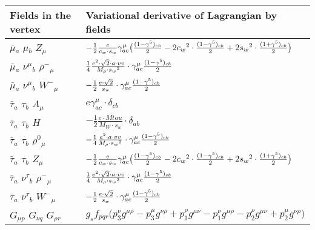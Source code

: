 \begin{center}
\begin{tabular}{|l|l|} \hline
Fields in the vertex & Variational derivative of Lagrangian by fields \\ \hline
$\bar{\mu}{}_{a }$ \phantom{-} $\mu{}_{b }$ \phantom{-} ${Z}_{\mu }$ \phantom{-}  &
	$-\frac{1}{2}\frac{ e}{ c_w \cdot s_w}\gamma_{a c}^\mu \big({(1-\gamma^5)_{c b}\over 2} -2 c_w{}^2 \cdot {(1-\gamma^5)_{c b}\over 2} +2 s_w{}^2 \cdot {(1+\gamma^5)_{c b}\over 2} \big)$\\[2mm]
$\bar{\mu}{}_{a }$ \phantom{-} $\nu^\mu{}_{b }$ \phantom{-} $\rho^-{}_{\mu }$ \phantom{-}  &
	$\frac{1}{4}\frac{ e{}^2  \cdot\sqrt{2} \cdot a \cdot vv}{ M_{\rho} \cdot s_w{}^2 }\cdot \gamma_{a c}^\mu {(1-\gamma^5)_{c b}\over 2} $\\[2mm]
$\bar{\mu}{}_{a }$ \phantom{-} $\nu^\mu{}_{b }$ \phantom{-} $W^-{}_{\mu }$ \phantom{-}  &
	$-\frac{1}{2}\frac{ e \cdot\sqrt{2}}{ s_w}\cdot \gamma_{a c}^\mu {(1-\gamma^5)_{c b}\over 2} $\\[2mm]
$\bar{\tau}{}_{a }$ \phantom{-} $\tau{}_{b }$ \phantom{-} ${A}_{\mu }$ \phantom{-}  &
	$ e\gamma_{a c}^\mu \cdot \delta_{c b} $\\[2mm]
$\bar{\tau}{}_{a }$ \phantom{-} $\tau{}_{b }$ \phantom{-} ${H}_{}$ \phantom{-}  &
	$-\frac{1}{2}\frac{ e \cdot Mtau}{ M_W \cdot s_w}\cdot \delta_{a b} $\\[2mm]
$\bar{\tau}{}_{a }$ \phantom{-} $\tau{}_{b }$ \phantom{-} $\rho^0{}_{\mu }$ \phantom{-}  &
	$-\frac{1}{4}\frac{ e{}^2  \cdot a \cdot vv}{ M_{\rho} \cdot s_w{}^2 }\cdot \gamma_{a c}^\mu {(1-\gamma^5)_{c b}\over 2} $\\[2mm]
$\bar{\tau}{}_{a }$ \phantom{-} $\tau{}_{b }$ \phantom{-} ${Z}_{\mu }$ \phantom{-}  &
	$-\frac{1}{2}\frac{ e}{ c_w \cdot s_w}\gamma_{a c}^\mu \big({(1-\gamma^5)_{c b}\over 2} -2 c_w{}^2 \cdot {(1-\gamma^5)_{c b}\over 2} +2 s_w{}^2 \cdot {(1+\gamma^5)_{c b}\over 2} \big)$\\[2mm]
$\bar{\tau}{}_{a }$ \phantom{-} $\nu^\tau{}_{b }$ \phantom{-} $\rho^-{}_{\mu }$ \phantom{-}  &
	$\frac{1}{4}\frac{ e{}^2  \cdot\sqrt{2} \cdot a \cdot vv}{ M_{\rho} \cdot s_w{}^2 }\cdot \gamma_{a c}^\mu {(1-\gamma^5)_{c b}\over 2} $\\[2mm]
$\bar{\tau}{}_{a }$ \phantom{-} $\nu^\tau{}_{b }$ \phantom{-} $W^-{}_{\mu }$ \phantom{-}  &
	$-\frac{1}{2}\frac{ e \cdot\sqrt{2}}{ s_w}\cdot \gamma_{a c}^\mu {(1-\gamma^5)_{c b}\over 2} $\\[2mm]
${G}_{\mu p }$ \phantom{-} ${G}_{\nu q }$ \phantom{-} ${G}_{\rho r }$ \phantom{-}  &
	$ g_sf_{p q r} \big(p_3^\nu g^{\mu \rho} -p_3^\mu g^{\nu \rho} +p_1^\rho g^{\mu \nu} -p_1^\nu g^{\mu \rho} -p_2^\rho g^{\mu \nu} +p_2^\mu g^{\nu \rho} \big)$\\[2mm]

\end{tabular}
\end{center}
